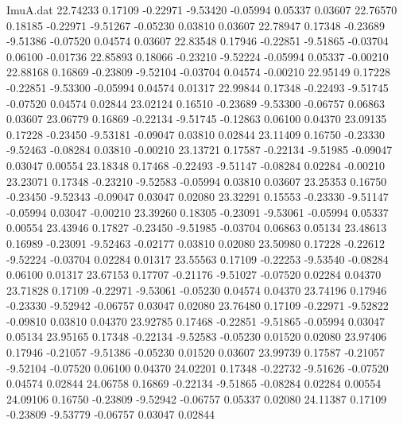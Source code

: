 \begin{filecontents}{ImuA.dat}
  22.74233    0.17109   -0.22971   -9.53420   -0.05994    0.05337    0.03607
  22.76570    0.18185   -0.22971   -9.51267   -0.05230    0.03810    0.03607
  22.78947    0.17348   -0.23689   -9.51386   -0.07520    0.04574    0.03607
  22.83548    0.17946   -0.22851   -9.51865   -0.03704    0.06100   -0.01736
  22.85893    0.18066   -0.23210   -9.52224   -0.05994    0.05337   -0.00210
  22.88168    0.16869   -0.23809   -9.52104   -0.03704    0.04574   -0.00210
  22.95149    0.17228   -0.22851   -9.53300   -0.05994    0.04574    0.01317
  22.99844    0.17348   -0.22493   -9.51745   -0.07520    0.04574    0.02844
  23.02124    0.16510   -0.23689   -9.53300   -0.06757    0.06863    0.03607
  23.06779    0.16869   -0.22134   -9.51745   -0.12863    0.06100    0.04370
  23.09135    0.17228   -0.23450   -9.53181   -0.09047    0.03810    0.02844
  23.11409    0.16750   -0.23330   -9.52463   -0.08284    0.03810   -0.00210
  23.13721    0.17587   -0.22134   -9.51985   -0.09047    0.03047    0.00554
  23.18348    0.17468   -0.22493   -9.51147   -0.08284    0.02284   -0.00210
  23.23071    0.17348   -0.23210   -9.52583   -0.05994    0.03810    0.03607
  23.25353    0.16750   -0.23450   -9.52343   -0.09047    0.03047    0.02080
  23.32291    0.15553   -0.23330   -9.51147   -0.05994    0.03047   -0.00210
  23.39260    0.18305   -0.23091   -9.53061   -0.05994    0.05337    0.00554
  23.43946    0.17827   -0.23450   -9.51985   -0.03704    0.06863    0.05134
  23.48613    0.16989   -0.23091   -9.52463   -0.02177    0.03810    0.02080
  23.50980    0.17228   -0.22612   -9.52224   -0.03704    0.02284    0.01317
  23.55563    0.17109   -0.22253   -9.53540   -0.08284    0.06100    0.01317
  23.67153    0.17707   -0.21176   -9.51027   -0.07520    0.02284    0.04370
  23.71828    0.17109   -0.22971   -9.53061   -0.05230    0.04574    0.04370
  23.74196    0.17946   -0.23330   -9.52942   -0.06757    0.03047    0.02080
  23.76480    0.17109   -0.22971   -9.52822   -0.09810    0.03810    0.04370
  23.92785    0.17468   -0.22851   -9.51865   -0.05994    0.03047    0.05134
  23.95165    0.17348   -0.22134   -9.52583   -0.05230    0.01520    0.02080
  23.97406    0.17946   -0.21057   -9.51386   -0.05230    0.01520    0.03607
  23.99739    0.17587   -0.21057   -9.52104   -0.07520    0.06100    0.04370
  24.02201    0.17348   -0.22732   -9.51626   -0.07520    0.04574    0.02844
  24.06758    0.16869   -0.22134   -9.51865   -0.08284    0.02284    0.00554
  24.09106    0.16750   -0.23809   -9.52942   -0.06757    0.05337    0.02080
  24.11387    0.17109   -0.23809   -9.53779   -0.06757    0.03047    0.02844

\end{filecontents}
